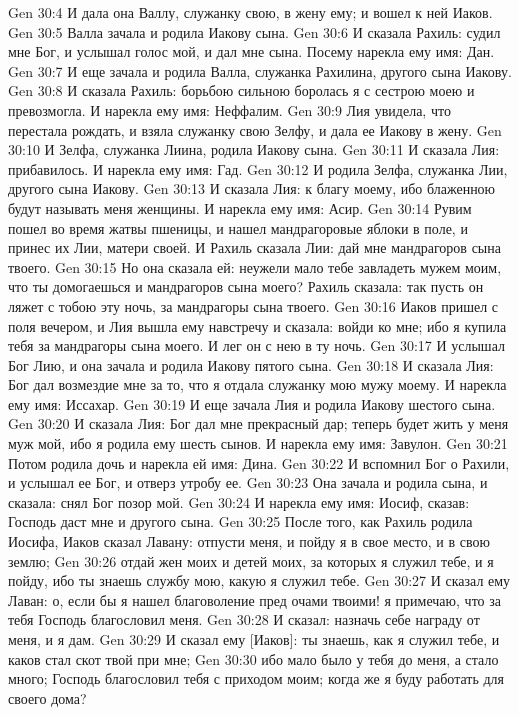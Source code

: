 Gen 30:4  И дала она Валлу, служанку свою, в жену ему; и вошел к ней Иаков.
Gen 30:5  Валла зачала и родила Иакову сына.
Gen 30:6  И сказала Рахиль: судил мне Бог, и услышал голос мой, и дал мне сына. Посему нарекла ему имя: Дан.
Gen 30:7  И еще зачала и родила Валла, служанка Рахилина, другого сына Иакову.
Gen 30:8  И сказала Рахиль: борьбою сильною боролась я с сестрою моею и превозмогла. И нарекла ему имя: Неффалим.
Gen 30:9  Лия увидела, что перестала рождать, и взяла служанку свою Зелфу, и дала ее Иакову в жену.
Gen 30:10  И Зелфа, служанка Лиина, родила Иакову сына.
Gen 30:11  И сказала Лия: прибавилось. И нарекла ему имя: Гад.
Gen 30:12  И родила Зелфа, служанка Лии, другого сына Иакову.
Gen 30:13  И сказала Лия: к благу моему, ибо блаженною будут называть меня женщины. И нарекла ему имя: Асир.
Gen 30:14  Рувим пошел во время жатвы пшеницы, и нашел мандрагоровые яблоки в поле, и принес их Лии, матери своей. И Рахиль сказала Лии: дай мне мандрагоров сына твоего.
Gen 30:15  Но она сказала ей: неужели мало тебе завладеть мужем моим, что ты домогаешься и мандрагоров сына моего? Рахиль сказала: так пусть он ляжет с тобою эту ночь, за мандрагоры сына твоего.
Gen 30:16  Иаков пришел с поля вечером, и Лия вышла ему навстречу и сказала: войди ко мне; ибо я купила тебя за мандрагоры сына моего. И лег он с нею в ту ночь.
Gen 30:17  И услышал Бог Лию, и она зачала и родила Иакову пятого сына.
Gen 30:18  И сказала Лия: Бог дал возмездие мне за то, что я отдала служанку мою мужу моему. И нарекла ему имя: Иссахар.
Gen 30:19  И еще зачала Лия и родила Иакову шестого сына.
Gen 30:20  И сказала Лия: Бог дал мне прекрасный дар; теперь будет жить у меня муж мой, ибо я родила ему шесть сынов. И нарекла ему имя: Завулон.
Gen 30:21  Потом родила дочь и нарекла ей имя: Дина.
Gen 30:22  И вспомнил Бог о Рахили, и услышал ее Бог, и отверз утробу ее.
Gen 30:23  Она зачала и родила сына, и сказала: снял Бог позор мой.
Gen 30:24  И нарекла ему имя: Иосиф, сказав: Господь даст мне и другого сына.
Gen 30:25  После того, как Рахиль родила Иосифа, Иаков сказал Лавану: отпусти меня, и пойду я в свое место, и в свою землю;
Gen 30:26  отдай жен моих и детей моих, за которых я служил тебе, и я пойду, ибо ты знаешь службу мою, какую я служил тебе.
Gen 30:27  И сказал ему Лаван: о, если бы я нашел благоволение пред очами твоими! я примечаю, что за тебя Господь благословил меня.
Gen 30:28  И сказал: назначь себе награду от меня, и я дам.
Gen 30:29  И сказал ему [Иаков]: ты знаешь, как я служил тебе, и каков стал скот твой при мне;
Gen 30:30  ибо мало было у тебя до меня, а стало много; Господь благословил тебя с приходом моим; когда же я буду работать для своего дома?
